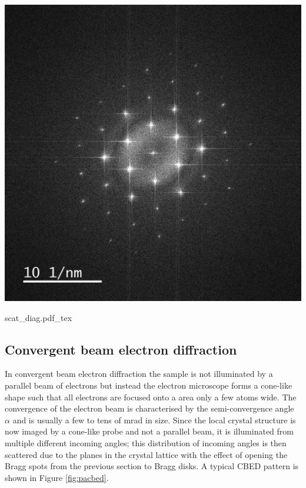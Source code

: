 \begin{minipage}[t]{0.49\textwidth}
    \centering
    \includegraphics[width=0.95\linewidth, keepaspectratio]{resources/Figures/fft_of_ml.png}
    \label{fig:diffraction_pattern}
\end{minipage}\hspace{0.02\textwidth}
\begin{minipage}[t]{0.49\textwidth}
    \centering
    \def\svgwidth{.7\linewidth}
    {scat_diag.pdf_tex}
    \label{fig:scatt_angle}
\end{minipage}


\subsection{Convergent beam electron diffraction}
In convergent beam electron diffraction the sample is not illuminated by a parallel beam of electrons but instead the electron microscope forms a cone-like shape such that all electrons are focused onto a area only a few atoms wide. The convergence of the electron beam is characterised by the semi-convergence angle $\alpha$ and is usually a few to tens of \si{\milli\radian} in size.
Since the local crystal structure is now imaged by a cone-like probe and not a parallel beam, it is illuminated from multiple different incoming angles; this distribution of incoming angles is then scattered due to the planes in the crystal lattice with the effect of opening the Bragg spots from the previous section to Bragg disks. A typical CBED pattern is shown in Figure \ref{fig:pacbed}.

